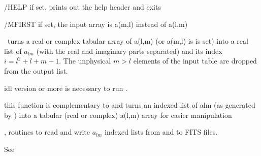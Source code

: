 \begin{keywords}
  \begin{kwlist}{} %
    \item[/HELP] %
	if set, prints out the help header and exits
    \item[/MFIRST] %
 if set, the input array is a(m,l) instead of a(l,m)
  \end{kwlist}
\end{keywords}  

\begin{codedescription}
{%
\thedocid\ turns a real or complex tabular array of a(l,m) (or a(m,l) is  is
set) into a real list of $a_{lm}$ (with the real and imaginary parts separated)
and its index $i=l^2+l+m+1$. The unphysical $m>l$ elements of the input
table are dropped from the output list.
}
\end{codedescription}



\begin{related}
  \begin{sulist}{} %
    \item[idl] version \idlversion or more is necessary to run \thedocid.
    \item[\htmlref{alm\_i2t}{idl:alm_i2t}] this function is complementary to
\thedocid{} and
turns an indexed list of alm (as generated by
) into a tabular (real or complex) a(l,m) array
for easier manipulation
  \item[\htmlref{alm2fits}{idl:alm2fits}, \htmlref{fits2alm}{idl:fits2alm}]
routines to read and write $a_{lm}$ indexed lists from and to FITS files.
  \end{sulist}
\end{related}

\begin{example}
{%
}%
{%
See 
}
\end{example}


